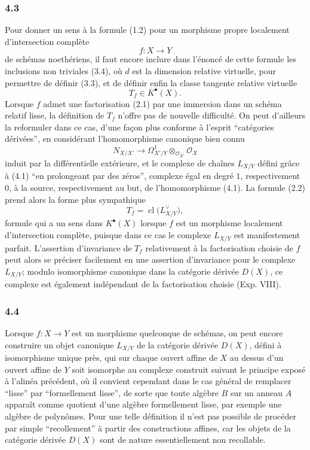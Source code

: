 \documentclass[11pt]{article}
\newcommand{\cl}{\operatorname{cl}}
\begin{document}
\subsubsection*{4.3}
Pour donner un sens \`a la formule (1.2) pour un morphisme propre localement d'intersection compl\`ete
\[
f:X\longrightarrow Y
\]
de sch\'emas noeth\'eriens, il faut encore inclure dans l'\'enonc\'e de cette formule les inclusions non triviales (3.4), o\`u $d$ est la dimension relative virtuelle, pour permettre de d\'efinir (3.3), et de d\'efinir enfin la classe tangente relative virtuelle
\[
T_f\in K^\bullet(X).
\]
Lorsque $f$ admet une factorisation (2.1) par une immersion dans un sch\'ema relatif lisse, la d\'efinition de $T_f$ n'offre pas de nouvelle difficult\'e. On peut d'ailleurs la reformuler dans ce cas, d'une fa\c{c}on plus conforme \`a l'esprit ``cat\'egories d\'eriv\'ees'', en consid\'erant l'homomorphisme canonique bien connu
\begin{equation}\tag{4.1}
N_{X/X'}\longrightarrow \Omega^1_{X'/Y}\otimes_{\mathcal O_{X'}}\mathcal O_X
\end{equation}
induit par la diff\'erentielle ext\'erieure, et le complexe de cha\^ines $L_{X/Y}$ d\'efini gr\^ace \`a (4.1) ``en prolongeant par des z\'eros'', complexe \'egal en degr\'e $1$, respectivement $0$, \`a la source, respectivement au but, de l'homomorphisme (4.1). La formule (2.2) prend alors la forme plus sympathique
\begin{equation}\tag{4.2}
T_f=\cl\bigl(L_{X/Y}^{\vee}\bigr),
\end{equation}
formule qui a un sens dans $K^\bullet(X)$ lorsque $f$ est un morphisme localement d'intersection compl\`ete, puisque dans ce cas le complexe $L_{X/Y}$ est manifestement parfait. L'assertion d'invariance de $T_f$ relativement \`a la factorisation choisie de $f$ peut alors se pr\'eciser facilement en une assertion d'invariance pour le complexe $L_{X/Y}$; modulo isomorphisme canonique dans la cat\'egorie d\'eriv\'ee $D(X)$, ce complexe est \'egalement ind\'ependant de la factorisation choisie (Exp. VIII).

\subsubsection*{4.4}
Lorsque $f:X\to Y$ est un morphisme quelconque de sch\'emas, on peut encore construire un objet canonique $L_{X/Y}$ de la cat\'egorie d\'eriv\'ee $D(X)$, d\'efini \`a isomorphisme unique pr\`es, qui sur chaque ouvert affine de $X$ au dessus d'un ouvert affine de $Y$ soit isomorphe au complexe construit suivant le principe expos\'e \`a l'alin\'ea pr\'ec\'edent, o\`u il convient cependant dans le cas g\'en\'eral de remplacer ``lisse'' par ``formellement lisse'', de sorte que toute alg\`ebre $B$ sur un anneau $A$ appara\^it comme quotient d'une alg\`ebre formellement lisse, par exemple une alg\`ebre de polyn\^omes. Pour une telle d\'efinition il n'est pas possible de proc\'eder par simple ``recollement'' \`a partir des constructions affines, car les objets de la cat\'egorie d\'eriv\'ee $D(X)$ sont de nature essentiellement non recollable.
\end{document}
